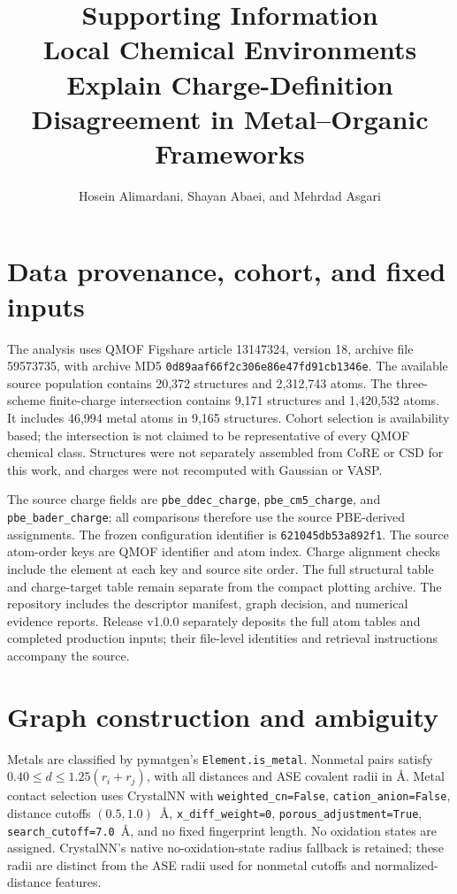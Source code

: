 \documentclass[11pt]{article}
\title{Supporting Information\\[6pt]\large Local Chemical Environments Explain Charge-Definition Disagreement in Metal--Organic Frameworks}
\author{Hosein Alimardani, Shayan Abaei, and Mehrdad Asgari}
\date{}
\begin{document}
\maketitle\tableofcontents
\section{Data provenance, cohort, and fixed inputs}
The analysis uses QMOF Figshare article 13147324, version 18, archive file 59573735, with archive MD5 \nolinkurl{0d89aaf66f2c306e86e47fd91cb1346e}.\cite{Rosen2021,Rosen2022,QMOFv18} The available source population contains 20,372 structures and 2,312,743 atoms. The three-scheme finite-charge intersection contains 9,171 structures and 1,420,532 atoms. It includes 46,994 metal atoms in 9,165 structures. Cohort selection is availability based; the intersection is not claimed to be representative of every QMOF chemical class. Structures were not separately assembled from CoRE or CSD for this work, and charges were not recomputed with Gaussian or VASP.

The source charge fields are \nolinkurl{pbe_ddec_charge}, \nolinkurl{pbe_cm5_charge}, and \nolinkurl{pbe_bader_charge}; all comparisons therefore use the source PBE-derived assignments. The frozen configuration identifier is \nolinkurl{621045db53a892f1}. The source atom-order keys are QMOF identifier and atom index. Charge alignment checks include the element at each key and source site order. The full structural table and charge-target table remain separate from the compact plotting archive. The repository includes the descriptor manifest, graph decision, and numerical evidence reports. Release v1.0.0 separately deposits the full atom tables and completed production inputs; their file-level identities and retrieval instructions accompany the source.

\section{Graph construction and ambiguity}
Metals are classified by pymatgen's \nolinkurl{Element.is_metal}. Nonmetal pairs satisfy $0.40\leq d\leq 1.25(r_i+r_j)$, with all distances and ASE covalent radii in \AA.\cite{Ong2013,Larsen2017} Metal contact selection uses CrystalNN with \nolinkurl{weighted_cn=False}, \nolinkurl{cation_anion=False}, distance cutoffs $(0.5,1.0)$~\AA, \nolinkurl{x_diff_weight=0}, \nolinkurl{porous_adjustment=True}, \nolinkurl{search_cutoff=7.0}~\AA, and no fixed fingerprint length.\cite{Zimmermann2020} No oxidation states are assigned. CrystalNN's native no-oxidation-state radius fallback is retained; these radii are distinct from the ASE radii used for nonmetal cutoffs and normalized-distance features.
\end{document}
